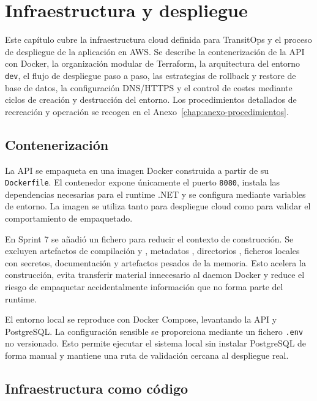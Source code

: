 \chapter{Infraestructura y despliegue}
\label{chap:infraestructura-despliegue}

Este capítulo cubre la infraestructura cloud definida para TransitOps y el proceso de despliegue de la aplicación en AWS. Se describe la contenerización de la API con Docker, la organización modular de Terraform, la arquitectura del entorno \texttt{dev}, el flujo de despliegue paso a paso, las estrategias de rollback y restore de base de datos, la configuración DNS/HTTPS y el control de costes mediante ciclos de creación y destrucción del entorno. Los procedimientos detallados de recreación y operación se recogen en el Anexo~\ref{chap:anexo-procedimientos}.

\section{Contenerización}
\label{sec:contenerizacion}

La API se empaqueta en una imagen Docker construida a partir de su \texttt{Dockerfile}. El contenedor expone únicamente el puerto \texttt{8080}, instala las dependencias necesarias para el runtime .NET y se configura mediante variables de entorno. La imagen se utiliza tanto para despliegue cloud como para validar el comportamiento de empaquetado.

En Sprint 7 se añadió un fichero  para reducir el contexto de construcción. Se excluyen artefactos de compilación  y , metadatos , directorios , ficheros locales con secretos, documentación y artefactos pesados de la memoria. Esto acelera la construcción, evita transferir material innecesario al daemon Docker y reduce el riesgo de empaquetar accidentalmente información que no forma parte del runtime.

El entorno local se reproduce con Docker Compose, levantando la API y PostgreSQL. La configuración sensible se proporciona mediante un fichero \texttt{.env} no versionado. Esto permite ejecutar el sistema local sin instalar PostgreSQL de forma manual y mantiene una ruta de validación cercana al despliegue real.

\section{Infraestructura como código}
\label{sec:infraestructura-codigo}

